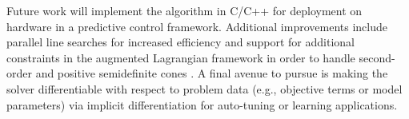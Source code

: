 Future work will implement the algorithm in C/C++ for deployment on hardware in a predictive control framework. Additional improvements include parallel line searches for increased efficiency and support for additional constraints in the augmented Lagrangian framework in order to handle second-order and positive semidefinite cones \cite{boyd2004convex}. A final avenue to pursue is making the solver differentiable  with respect to problem data (e.g., objective terms or model parameters) via implicit differentiation \cite{amos2018differentiable} for auto-tuning \cite{agrawal2020learning} or learning applications.